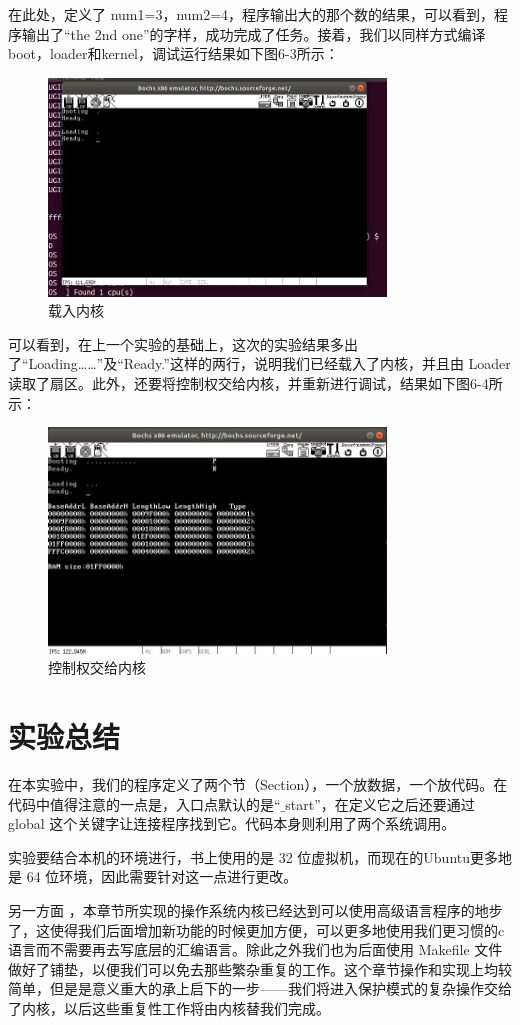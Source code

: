 在此处，定义了 num1=3，num2=4，程序输出大的那个数的结果，可以看到，程序输出了“the 2nd one”的字样，成功完成了任务。接着，我们以同样方式编译boot，loader和kernel，调试运行结果如下图6-3所示：
\begin{figure}[H]
  \centering
  \includegraphics[width=0.8\textwidth]{figures/chapter6/6-3.jpg}
  \caption{载入内核}
  \label{fig:3}
\end{figure}

可以看到，在上一个实验的基础上，这次的实验结果多出了“Loading……”及“Ready.”这样的两行，说明我们已经载入了内核，并且由 Loader 读取了扇区。此外，还要将控制权交给内核，并重新进行调试，结果如下图6-4所示：
\begin{figure}[H]
  \centering
  \includegraphics[width=0.8\textwidth]{figures/chapter6/6-4.jpg}
  \caption{控制权交给内核}
  \label{fig:4}
\end{figure}

\section{实验总结}
在本实验中，我们的程序定义了两个节（Section），一个放数据，一个放代码。在代码中值得注意的一点是，入口点默认的是“$\_$start”，在定义它之后还要通过 global 这个关键字让连接程序找到它。代码本身则利用了两个系统调用。\par
实验要结合本机的环境进行，书上使用的是 32 位虚拟机，而现在的Ubuntu更多地是 64 位环境，因此需要针对这一点进行更改。\par
另一方面 ，本章节所实现的操作系统内核已经达到可以使用高级语言程序的地步了，这使得我们后面增加新功能的时候更加方便，可以更多地使用我们更习惯的c语言而不需要再去写底层的汇编语言。除此之外我们也为后面使用 Makefile 文件做好了铺垫，以便我们可以免去那些繁杂重复的工作。这个章节操作和实现上均较简单，但是是意义重大的承上启下的一步——我们将进入保护模式的复杂操作交给了内核，以后这些重复性工作将由内核替我们完成。\par



